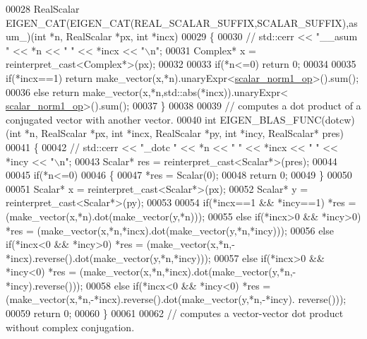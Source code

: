 \begin{DoxyCode}
00028 RealScalar EIGEN\_CAT(EIGEN\_CAT(REAL\_SCALAR\_SUFFIX,SCALAR\_SUFFIX),asum\_)(\textcolor{keywordtype}{int} *n, RealScalar *px, \textcolor{keywordtype}{int} *incx)
00029 \{
00030 \textcolor{comment}{//   std::cerr << "\_\_asum " << *n << " " << *incx << "\(\backslash\)n";}
00031   Complex* x = \textcolor{keyword}{reinterpret\_cast<}Complex*\textcolor{keyword}{>}(px);
00032 
00033   \textcolor{keywordflow}{if}(*n<=0) \textcolor{keywordflow}{return} 0;
00034 
00035   \textcolor{keywordflow}{if}(*incx==1)  \textcolor{keywordflow}{return} make\_vector(x,*n).unaryExpr<\hyperlink{structscalar__norm1__op}{scalar\_norm1\_op}>().sum();
00036   \textcolor{keywordflow}{else}          \textcolor{keywordflow}{return} make\_vector(x,*n,std::abs(*incx)).unaryExpr<
      \hyperlink{structscalar__norm1__op}{scalar\_norm1\_op}>().sum();
00037 \}
00038 
00039 \textcolor{comment}{// computes a dot product of a conjugated vector with another vector.}
00040 \textcolor{keywordtype}{int} EIGEN\_BLAS\_FUNC(dotcw)(\textcolor{keywordtype}{int} *n, RealScalar *px, \textcolor{keywordtype}{int} *incx, RealScalar *py, \textcolor{keywordtype}{int} *incy, RealScalar* pres)
00041 \{
00042 \textcolor{comment}{//   std::cerr << "\_dotc " << *n << " " << *incx << " " << *incy << "\(\backslash\)n";}
00043   Scalar* res = \textcolor{keyword}{reinterpret\_cast<}Scalar*\textcolor{keyword}{>}(pres);
00044 
00045   \textcolor{keywordflow}{if}(*n<=0)
00046   \{
00047     *res = Scalar(0);
00048     \textcolor{keywordflow}{return} 0;
00049   \}
00050 
00051   Scalar* x = \textcolor{keyword}{reinterpret\_cast<}Scalar*\textcolor{keyword}{>}(px);
00052   Scalar* y = \textcolor{keyword}{reinterpret\_cast<}Scalar*\textcolor{keyword}{>}(py);
00053 
00054   \textcolor{keywordflow}{if}(*incx==1 && *incy==1)    *res = (make\_vector(x,*n).dot(make\_vector(y,*n)));
00055   \textcolor{keywordflow}{else} \textcolor{keywordflow}{if}(*incx>0 && *incy>0) *res = (make\_vector(x,*n,*incx).dot(make\_vector(y,*n,*incy)));
00056   \textcolor{keywordflow}{else} \textcolor{keywordflow}{if}(*incx<0 && *incy>0) *res = (make\_vector(x,*n,-*incx).reverse().dot(make\_vector(y,*n,*incy)));
00057   \textcolor{keywordflow}{else} \textcolor{keywordflow}{if}(*incx>0 && *incy<0) *res = (make\_vector(x,*n,*incx).dot(make\_vector(y,*n,-*incy).reverse()));
00058   \textcolor{keywordflow}{else} \textcolor{keywordflow}{if}(*incx<0 && *incy<0) *res = (make\_vector(x,*n,-*incx).reverse().dot(make\_vector(y,*n,-*incy).
      reverse()));
00059   \textcolor{keywordflow}{return} 0;
00060 \}
00061 
00062 \textcolor{comment}{// computes a vector-vector dot product without complex conjugation.}

\end{DoxyCode}
